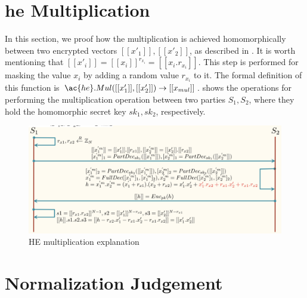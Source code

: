 \begin{appendices}

\section{\acf{he} Multiplication}
\label{app:he-multiplication}

In this section, we proof how the multiplication is achieved homomorphically between two encrypted vectors $[[x'_1]], [[x'_2]]$, as described in \cite{liu2016efficient2}.
It is worth mentioning that $[[x'_i]] = [[x_i]]^{r_{x_i}} = [[x_i . r_{x_i}]]$.
This step is performed for masking the value $x_i$ by adding a random value $r_{x_i}$ to it.
The formal definition of this function is $\ac{he}.Mul([[x'_1]], [[x'_2]]) \rightarrow [[x_{mul}]]$.
 shows the operations for performing the multiplication operation between two parties $S_1, S_2$, where they hold the homomorphic secret key $sk_1, sk_2$, respectively.

\begin{figure}[thb]
\centering
  \includegraphics[width=0.8\linewidth]{resources/HE-mul-explain.pdf}
  \caption{HE multiplication explanation}
  \label{fig:he-mul-explain}
\end{figure}
    
\section{Normalization Judgement}
\label{app:normalization-judgement}


\end{appendices}
